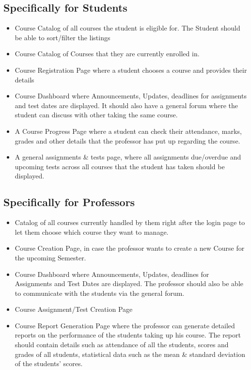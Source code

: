 \documentclass[12pt, a4]{report}
\begin{document}
\subsection{Specifically for Students}
\begin{itemize}
    \item Course Catalog  of all courses the student is eligible for. The Student should be able to sort/filter the listings
    \item Course Catalog of Courses that they are currently enrolled in.
    \item Course Registration Page where a student chooses a course and provides their details
    \item Course Dashboard where Announcements, Updates, deadlines for assignments and test dates are displayed. It should also have a general forum where the student can discuss with other taking the same course.
    \item A Course Progress Page where a student can check their attendance, marks, grades and other details that the professor has put up regarding the course.
    \item A general assignments \& tests page, where all assignments due/overdue and upcoming tests across all courses that the student has taken should be displayed.
\end{itemize}

\subsection{Specifically for Professors}
\begin{itemize}
    \item Catalog of all courses currently handled by them right after the login page to let them choose which course they want to manage.
    \item Course Creation Page, in case the professor wants to create a new Course for the upcoming Semester.
    \item Course Dashboard where Announcements, Updates, deadlines for Assignments and Test Dates are displayed. The professor should also be able to communicate with the students via the general forum.
    \item Course Assignment/Test Creation Page
    \item Course Report Generation Page where the professor can generate detailed reports on the performance of the students taking up his course. The report should contain details such as attendance of all the students, scores and grades of all students, statistical data such as the mean \& standard deviation of the students' scores.
\end{itemize}
\end{document}
